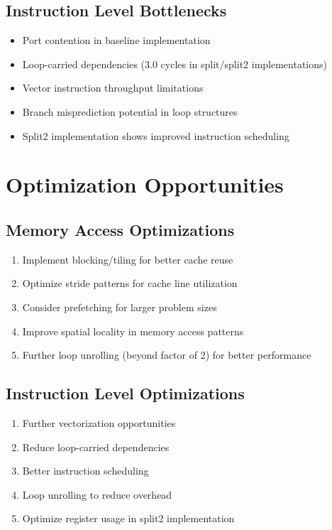 \documentclass[11pt,a4paper]{article}
\begin{document}
\subsection{Instruction Level Bottlenecks}
\begin{itemize}
    \item Port contention in baseline implementation
    \item Loop-carried dependencies (3.0 cycles in split/split2 implementations)
    \item Vector instruction throughput limitations
    \item Branch misprediction potential in loop structures
    \item Split2 implementation shows improved instruction scheduling
\end{itemize}

\section{Optimization Opportunities}
\subsection{Memory Access Optimizations}
\begin{enumerate}
    \item Implement blocking/tiling for better cache reuse
    \item Optimize stride patterns for cache line utilization
    \item Consider prefetching for larger problem sizes
    \item Improve spatial locality in memory access patterns
    \item Further loop unrolling (beyond factor of 2) for better performance
\end{enumerate}

\subsection{Instruction Level Optimizations}
\begin{enumerate}
    \item Further vectorization opportunities
    \item Reduce loop-carried dependencies
    \item Better instruction scheduling
    \item Loop unrolling to reduce overhead
    \item Optimize register usage in split2 implementation
\end{enumerate}
\end{document}
